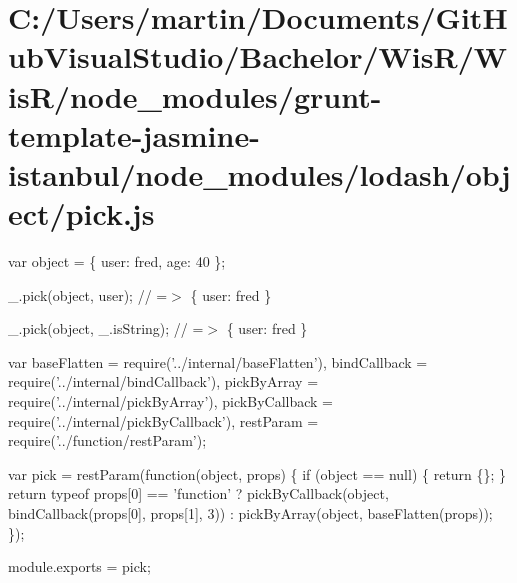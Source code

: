 \hypertarget{_c_1_2_users_2martin_2_documents_2_git_hub_visual_studio_2_bachelor_2_wis_r_2_wis_r_2node_module8be978983206cdb84953ba0620a20919}{}\section{C\+:/\+Users/martin/\+Documents/\+Git\+Hub\+Visual\+Studio/\+Bachelor/\+Wis\+R/\+Wis\+R/node\+\_\+modules/grunt-\/template-\/jasmine-\/istanbul/node\+\_\+modules/lodash/object/pick.\+js}
var object = \{ \textquotesingle{}user\textquotesingle{}\+: \textquotesingle{}fred\textquotesingle{}, \textquotesingle{}age\textquotesingle{}\+: 40 \};

\+\_\+.\+pick(object, \textquotesingle{}user\textquotesingle{}); // =$>$ \{ \textquotesingle{}user\textquotesingle{}\+: \textquotesingle{}fred\textquotesingle{} \}

\+\_\+.\+pick(object, \+\_\+.\+is\+String); // =$>$ \{ \textquotesingle{}user\textquotesingle{}\+: \textquotesingle{}fred\textquotesingle{} \}


\begin{DoxyCodeInclude}
var baseFlatten = require(\textcolor{stringliteral}{'../internal/baseFlatten'}),
    bindCallback = require(\textcolor{stringliteral}{'../internal/bindCallback'}),
    pickByArray = require(\textcolor{stringliteral}{'../internal/pickByArray'}),
    pickByCallback = require(\textcolor{stringliteral}{'../internal/pickByCallback'}),
    restParam = require(\textcolor{stringliteral}{'../function/restParam'});

var pick = restParam(\textcolor{keyword}{function}(\textcolor{keywordtype}{object}, props) \{
  \textcolor{keywordflow}{if} (\textcolor{keywordtype}{object} == null) \{
    \textcolor{keywordflow}{return} \{\};
  \}
  \textcolor{keywordflow}{return} typeof props[0] == \textcolor{stringliteral}{'function'}
    ? pickByCallback(\textcolor{keywordtype}{object}, bindCallback(props[0], props[1], 3))
    : pickByArray(object, baseFlatten(props));
\});

module.exports = pick;
\end{DoxyCodeInclude}
 